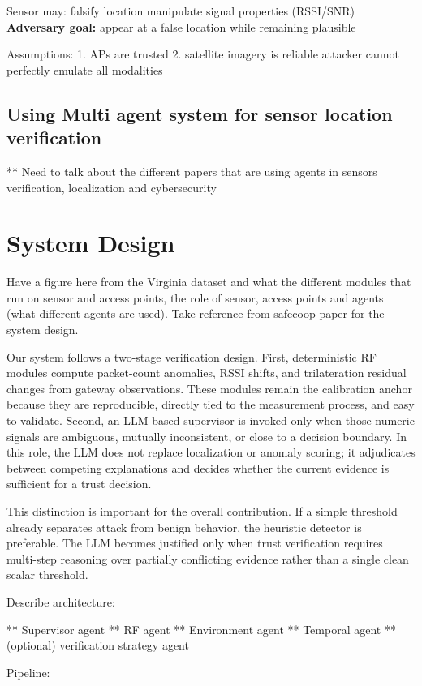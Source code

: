 \documentclass[10pt, twocolumn, letterpaper]{article}
\begin{document}
Sensor may:
falsify location
manipulate signal properties (RSSI/SNR)
\textbf{Adversary goal:}
appear at a false location while remaining plausible


Assumptions:
1. APs are trusted
2. satellite imagery is reliable attacker cannot perfectly emulate all modalities

\subsection{Using Multi agent system for sensor location verification}
** Need to talk about the different papers that are using agents in sensors verification, localization and cybersecurity 




\section{System Design}
Have a figure here from the Virginia dataset and what the different modules that run on sensor and access points, the role of sensor, access points and agents (what different agents are used). Take reference from safecoop paper for the system design. 

Our system follows a two-stage verification design. First, deterministic RF modules compute packet-count anomalies, RSSI shifts, and trilateration residual changes from gateway observations. These modules remain the calibration anchor because they are reproducible, directly tied to the measurement process, and easy to validate. Second, an LLM-based supervisor is invoked only when those numeric signals are ambiguous, mutually inconsistent, or close to a decision boundary. In this role, the LLM does not replace localization or anomaly scoring; it adjudicates between competing explanations and decides whether the current evidence is sufficient for a trust decision.

This distinction is important for the overall contribution. If a simple threshold already separates attack from benign behavior, the heuristic detector is preferable. The LLM becomes justified only when trust verification requires multi-step reasoning over partially conflicting evidence rather than a single clean scalar threshold.


Describe architecture:

** Supervisor agent
** RF agent
** Environment agent
** Temporal agent
** (optional) verification strategy agent

Pipeline:
\end{document}
